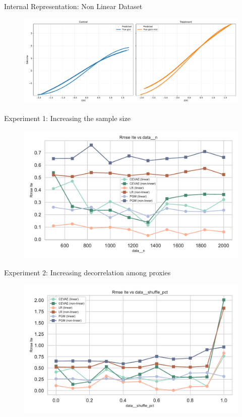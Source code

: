 \documentclass[10pt]{beamer}
\begin{document}
\begin{frame}{Internal Representation: Non Linear Dataset}
  \begin{figure}[H]
    \includegraphics[width=\textwidth]{../src/results/non_linear_predicted_vs_true.pdf}
  \end{figure}  
\end{frame}

\begin{frame}{Experiment 1: Increasing the sample size}
  \begin{figure}[H]
      \includegraphics[width=\textwidth]{images/MyRun_data__n--rmse_ite.pdf}
    \end{figure}
\end{frame}

\begin{frame}{Experiment 2: Increasing decorrelation among proxies}
    \begin{figure}[H]
      \includegraphics[width=\textwidth]{images/MyRun_data__shuffle_pct--rmse_ite.pdf}
    \end{figure}

\end{frame}
\end{document}
